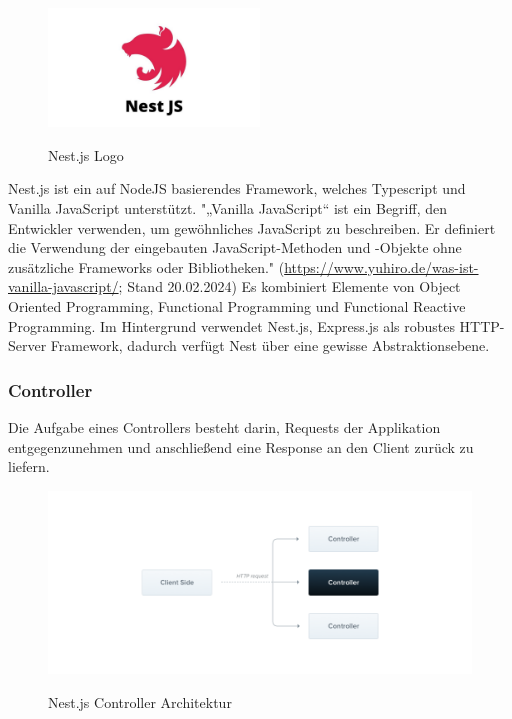 \begin{figure}[h]
    \centering
    \includegraphics[width=0.5\textwidth]{pics/nest_js_logo.jpg}
    \caption{Nest.js Logo}
    \cite{Nest_js_logo}
    \label{fig:mesh1}
\end{figure}

Nest.js ist ein auf NodeJS basierendes Framework, welches Typescript und Vanilla JavaScript unterstützt. 
\newline
"„Vanilla JavaScript“ ist ein Begriff, den Entwickler verwenden, um gewöhnliches JavaScript zu beschreiben. Er definiert die Verwendung der eingebauten JavaScript-Methoden und -Objekte ohne zusätzliche Frameworks oder Bibliotheken."
\newline
(\url{https://www.yuhiro.de/was-ist-vanilla-javascript/}; Stand 20.02.2024)
\newline
Es kombiniert Elemente von Object Oriented Programming, Functional Programming und Functional Reactive Programming. Im Hintergrund verwendet Nest.js, Express.js als robustes HTTP-Server Framework, dadurch verfügt Nest über eine gewisse Abstraktionsebene.
\cite{Nest_js_Introduction}
\newpage

\subsubsection{Controller}
Die Aufgabe eines Controllers besteht darin, Requests der Applikation entgegenzunehmen und anschließend eine Response an den Client zurück zu liefern.

\begin{figure}[h]
    \centering
    \includegraphics[width=1\textwidth]{pics/Nest_js_Controller.png}
    \caption{Nest.js Controller Architektur}
    \cite{Nest_js_Controller_Architektur}
    \label{fig:mesh1}
\end{figure}

